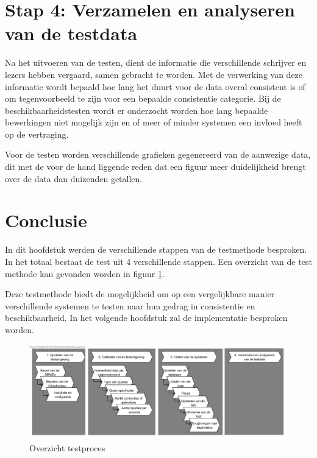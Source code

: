 \section{Stap 4: Verzamelen en analyseren van de testdata}
Na het uitvoeren van de testen, dient de informatie die verschillende schrijver en lezers hebben vergaard, samen gebracht te worden. Met de verwerking van deze informatie wordt bepaald hoe lang het duurt voor de data overal consistent is of om  tegenvoorbeeld te zijn voor een bepaalde consistentie categorie. Bij de beschikbaarheidstesten wordt er onderzocht worden hoe lang bepaalde bewerkingen niet mogelijk zijn en of meer of minder systemen een invloed heeft op de vertraging. 

Voor de testen worden verschillende grafieken gegenereerd van de aanwezige data, dit met de voor de hand liggende reden dat een figuur meer duidelijkheid brengt over de data dan duizenden getallen.  

\section{Conclusie}
In dit hoofdstuk werden de verschillende stappen van de testmethode besproken. In het totaal bestaat de test uit 4 verschillende stappen. Een overzicht van de test methode kan gevonden worden in figuur \ref{fig:test-process-detailed}. 

Deze testmethode biedt de mogelijkheid om op een vergelijkbare manier verschillende systemen te testen naar hun gedrag in consistentie en beschikbaarheid. In het volgende hoofdstuk zal de implementatie besproken worden. 

\begin{figure}[htb!]
\centering
\includegraphics[width=\linewidth]{img/Test-Process-Detailed-Overview}
\caption{Overzicht testproces}
\label{fig:test-process-detailed}
\end{figure}
